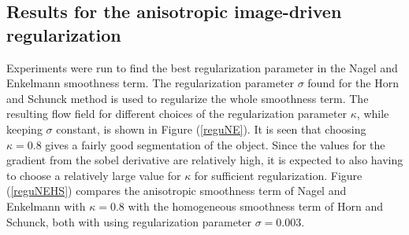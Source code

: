 \subsection{Results for the anisotropic image-driven regularization}
Experiments were run to find the best regularization parameter in the Nagel and Enkelmann smoothness term. The regularization parameter $\sigma$ found for the Horn and Schunck method is used to regularize the whole smoothness term. The resulting flow field for different choices of the regularization parameter $\kappa$, while keeping $\sigma$ constant, is shown in Figure (\ref{reguNE}). It is seen that choosing $\kappa = 0.8$ gives a fairly good segmentation of the object. Since the values for the gradient from the sobel derivative are relatively high, it is expected to also having to choose a relatively large value for $\kappa$ for sufficient regularization. Figure (\ref{reguNEHS}) compares the anisotropic smoothness term of Nagel and Enkelmann with $\kappa = 0.8$ with the homogeneous smoothness term of Horn and Schunck, both with using regularization parameter $\sigma = 0.003$. 

%
%
